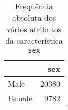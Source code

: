\begin{table}
\centering
\caption{Frequência absoluta dos vários atributos da característica \texttt{sex}}
\begin{tabular}{lr}
\toprule
{} &    sex \\
\midrule
 Male   &  20380 \\
 Female &   9782 \\
\bottomrule
\end{tabular}
\end{table}
